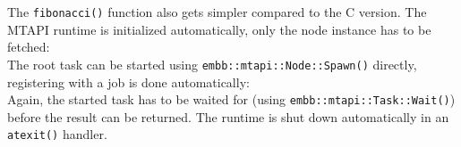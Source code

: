 The \lstinline|fibonacci()| function also gets simpler compared to the C version. The MTAPI runtime is initialized automatically, only the node instance has to be fetched:
%
\\
%
The root task can be started using \lstinline|embb::mtapi::Node::Spawn()| directly, registering with a job is done automatically:
%
\\
%
Again, the started task has to be waited for (using \lstinline|embb::mtapi::Task::Wait()|) before the result can be returned. The runtime is shut down automatically in an \lstinline|atexit()| handler.
